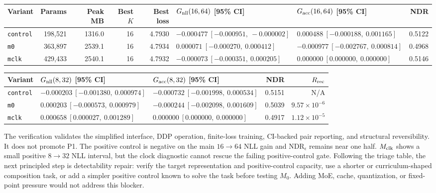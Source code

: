 \documentclass[11pt]{article}
\newcommand{\code}[1]{\texttt{#1}}
\begin{document}
\begin{center}
\scriptsize
\setlength{\tabcolsep}{3pt}
\renewcommand{\arraystretch}{1.12}
\begin{tabularx}{\textwidth}{@{}L{0.13\textwidth} r r r r L{0.22\textwidth} L{0.22\textwidth} r@{}}
\toprule
\textbf{Variant} & \textbf{Params} & \textbf{Peak MB} & \textbf{Best \(K\)} & \textbf{Best loss} & \textbf{\(G_{\rm nll}(16,64)\) [95\% CI]} & \textbf{\(G_{\rm acc}(16,64)\) [95\% CI]} & \textbf{NDR} \\
\midrule
\code{control} & 198{,}521 & 1316.0 & 16 & 4.7930 & \(-0.000477\ [-0.000951,\ -0.000002]\) & \(0.000488\ [-0.000188,\ 0.001165]\) & 0.5122 \\
\code{m0} & 363{,}897 & 2539.1 & 16 & 4.7934 & \(0.000071\ [-0.000270,\ 0.000412]\) & \(-0.000977\ [-0.002767,\ 0.000814]\) & 0.4968 \\
\code{mclk} & 429{,}433 & 2540.1 & 16 & 4.7932 & \(-0.000073\ [-0.000351,\ 0.000205]\) & \(0.000000\ [0.000000,\ 0.000000]\) & 0.5146 \\
\bottomrule
\end{tabularx}
\end{center}

\begin{center}
\scriptsize
\setlength{\tabcolsep}{3pt}
\renewcommand{\arraystretch}{1.12}
\begin{tabularx}{\textwidth}{@{}L{0.15\textwidth} L{0.28\textwidth} L{0.28\textwidth} r r@{}}
\toprule
\textbf{Variant} & \textbf{\(G_{\rm nll}(8,32)\) [95\% CI]} & \textbf{\(G_{\rm acc}(8,32)\) [95\% CI]} & \textbf{NDR} & \textbf{\(R_{\rm rec}\)} \\
\midrule
\code{control} & \(-0.000203\ [-0.001380,\ 0.000974]\) & \(-0.000732\ [-0.001998,\ 0.000534]\) & 0.5151 & N/A \\
\code{m0} & \(0.000203\ [-0.000573,\ 0.000979]\) & \(-0.000244\ [-0.002098,\ 0.001609]\) & 0.5039 & \(9.57{\times}10^{-6}\) \\
\code{mclk} & \(0.000658\ [0.000027,\ 0.001289]\) & \(0.000000\ [0.000000,\ 0.000000]\) & 0.4917 & \(1.12{\times}10^{-5}\) \\
\bottomrule
\end{tabularx}
\end{center}

The verification validates the simplified interface, DDP operation, finite-loss training,
CI-backed pair reporting, and structural reversibility.  It does not promote P1.  The positive
control is negative on the main \(16\to64\) NLL gain and \(\mathrm{NDR}_\epsilon\) remains near one
half.  \(M_{\rm clk}\) shows a small positive \(8\to32\) NLL interval, but the clock diagnostic
cannot rescue the failing positive-control gate.  Following the triage table, the next principled
step is detectability repair: verify the target representation and positive-control capacity, use
a shorter or curriculum-shaped composition task, or add a simpler positive control known to solve
the task before testing \(M_0\).  Adding MoE, cache, quantization, or fixed-point pressure would not
address this blocker.
\end{document}
